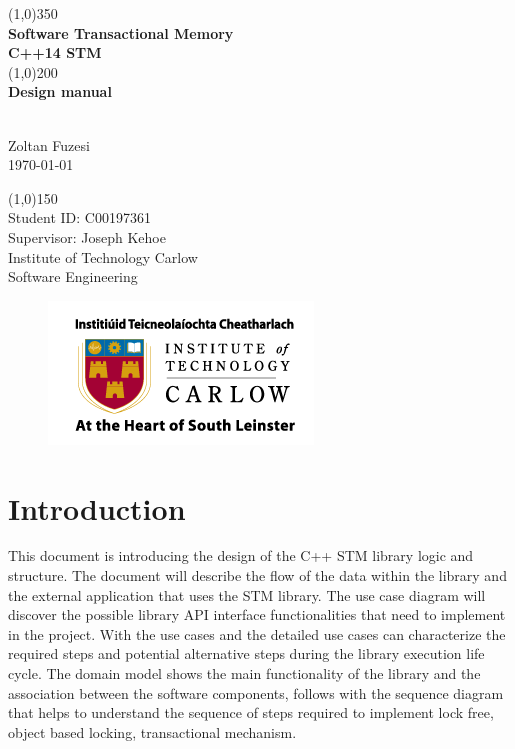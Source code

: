 \documentclass[12pt]{article}
\begin{document}
\begin{titlepage}
	\begin{center}
	\line(1,0){350}\\
	[0.3 cm]
	\huge{\textbf{Software Transactional Memory\\[0.3 cm]C++14 STM\\ }} 
	\line(1,0){200}\\
	[0.3 cm]
	\huge{\textbf{Design manual }} 
		\begin{LARGE}
		\\[0.3 cm]Zoltan Fuzesi\\
		\today
		\end{LARGE}
		
		\begin{LARGE}
		\line(1,0){150}\\
		[1.0 cm]
		Student ID: C00197361\\
		Supervisor: Joseph Kehoe\\
		\color{gray}Institute of Technology Carlow\\
		\color{gray}Software Engineering
		\end{LARGE}
		
\begin{figure}[h!]
\centering
\includegraphics[scale=0.7]{Pictures/carlow.png}
\end{figure}
		
	\end{center}
\end{titlepage}

\tableofcontents







\clearpage
{}
\setcounter{page}{1}

\section{Introduction}
This document is introducing the design of the C++ STM library logic and structure. The document will describe the flow of the data within the library and the external application that uses the STM library. The use case diagram will discover the possible library API interface functionalities that need to implement in the project. With the use cases and the detailed use cases can characterize the required steps and potential alternative steps during the library execution life cycle. The domain model shows the main functionality of the library and the association between the software components, follows with the sequence diagram that helps to understand the sequence of steps required to implement lock free, object based locking, transactional mechanism.\\
\end{document}
